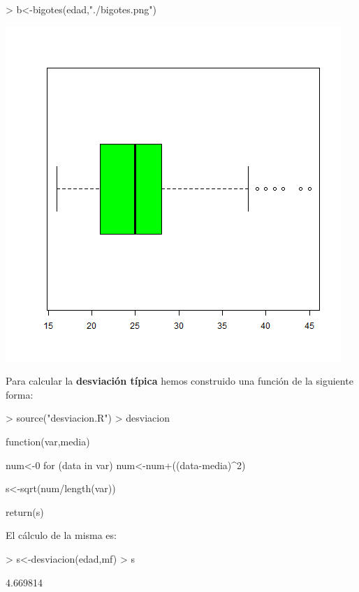 \documentclass [a4paper] {article}
\begin{document}
\begin{Schunk}
\begin{Sinput}
> b<-bigotes(edad,"./bigotes.png")
\end{Sinput}
\end{Schunk}
\includegraphics[width=\textwidth]{bigotes}

Para calcular la \textbf{desviaci\'on t\'ipica} hemos construido una funci\'on de la siguiente
forma:
\begin{Schunk}
\begin{Sinput}
> source("desviacion.R")
> desviacion
\end{Sinput}
\begin{Soutput}
function(var,media) {
    num<-0
    for (data in var){
        num<-num+((data-media)^2)
    }

    s<-sqrt(num/length(var))

    return(s)
}
\end{Soutput}
\end{Schunk}

El c\'alculo de la misma es:
\begin{Schunk}
\begin{Sinput}
> s<-desviacion(edad,mf)
> s
\end{Sinput}
\begin{Soutput}
[1] 4.669814
\end{Soutput}
\end{Schunk}
\end{document}
